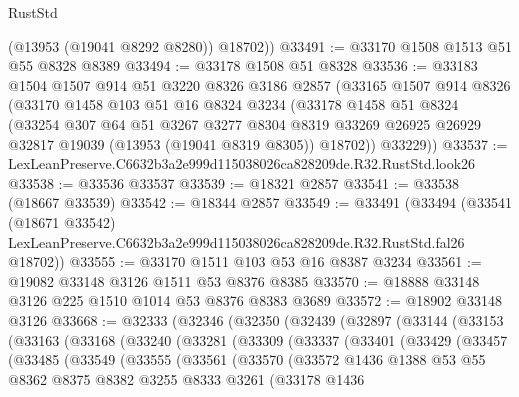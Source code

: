 \begin{lexlean}{RustStd}
\begin{coremodule}
        (@13953 (@19041 @8292 @8280))
        @18702))
@33491 := @33170 @1508 @1513 @51 @55 @8328 @8389
@33494 := @33178 @1508 @51 @8328
@33536 := @33183
    @1504
    @1507
    @914
    @51
    @3220
    @8326
    @3186
    @2857
    (@33165
      @1507
      @914
      @8326
      (@33170
        @1458
        @103
        @51
        @16
        @8324
        @3234
        (@33178
          @1458
          @51
          @8324
          (@33254
            @307
            @64
            @51
            @3267
            @3277
            @8304
            @8319
            @33269
            @26925
            @26929
            @32817
            @19039
            (@13953 (@19041 @8319 @8305))
            @18702))
        @33229))
@33537 := LexLeanPreserve.C6632b3a2e999d115038026ca828209de.R32.RustStd.look26
@33538 := @33536 @33537
@33539 := @18321 @2857
@33541 := @33538 (@18667 @33539)
@33542 := @18344 @2857
@33549 := @33491
    (@33494
      (@33541
        (@18671 @33542)
        LexLeanPreserve.C6632b3a2e999d115038026ca828209de.R32.RustStd.fal26
        @18702))
@33555 := @33170 @1511 @103 @53 @16 @8387 @3234
@33561 := @19082 @33148 @3126 @1511 @53 @8376 @8385
@33570 := @18888 @33148 @3126 @225 @1510 @1014 @53 @8376 @8383 @3689
@33572 := @18902 @33148 @3126
@33668 := @32333
    (@32346
      (@32350
        (@32439
          (@32897
            (@33144
              (@33153
                (@33163
                  (@33168
                    (@33240
                      (@33281
                        (@33309
                          (@33337
                            (@33401
                              (@33429
                                (@33457
                                  (@33485
                                    (@33549
                                      (@33555
                                        (@33561
                                          (@33570
                                            (@33572
                                              @1436
                                              @1388
                                              @53
                                              @55
                                              @8362
                                              @8375
                                              @8382
                                              @3255
                                              @8333
                                              @3261
                                              (@33178
                                                @1436

\end{coremodule}
\end{lexlean}

